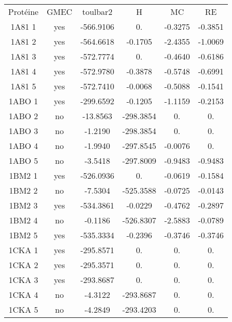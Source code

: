     \begin{table}[h]
      \centering

      \begin{tabular}{cccccc}


        \toprule
        Protéine & GMEC & toulbar2 & H & MC & RE \\
        \cmidrule{1-6}
        1A81 1 & yes  &  -566.9106 & 0. & -0.3275 & -0.3851 \\         
        1A81 2 & yes  &  -564.6618 & -0.1705 & -2.4355 & -1.0069 \\   
        1A81 3 & yes  &  -572.7774 & 0. & -0.4640 & -0.6186 \\         
        1A81 4 & yes  &  -572.9780 & -0.3878 & -0.5748 & -0.6991 \\    
        1A81 5 & yes  &  -572.7410 & -0.0068 & -0.5088 & -0.1541 \\    
        1ABO 1 & yes  &  -299.6592 & -0.1205 & -1.1159 & -0.2153 \\   
        1ABO 2 & no   &  -13.8563  & -298.3854 & 0. & 0. \\               
        1ABO 3 & no   &  -1.2190   & -298.3854 & 0. & 0. \\                 
        1ABO 4 & no   &  -1.9940   & -297.8545 & -0.0076 & 0. \\            
        1ABO 5 & no   &  -3.5418   & -297.8009 & -0.9483 & -0.9483 \\       
        1BM2 1 & yes  &  -526.0936 & 0. & -0.0619 & -0.1584 \\         
        1BM2 2 & no   &  -7.5304   & -525.3588 & -0.0725 & -0.0143 \\     
        1BM2 3 & yes  &  -534.3861 & -0.0229 & -0.4762 & -0.2897 \\    
        1BM2 4 & no   &  -0.1186   & -526.8307 & -2.5883 & -0.0789 \\     
        1BM2 5 & yes  &  -535.3334 & -0.2396 & -0.3746 & -0.3746 \\    
        1CKA 1 & yes  & -295.8571  & 0.& 0. & 0. \\                   
        1CKA 2 & yes  & -295.3571  & 0. & 0. & 0. \\                   
        1CKA 3 & yes  & -293.8687  & 0. & 0. & 0.\\                   
        1CKA 4 & no   &  -4.3122   & -293.8687 & 0. & 0. \\               
        1CKA 5 & no   &  -4.2849   & -293.4203 & 0. & 0. \\           

\end{tabular}
\end{table}
